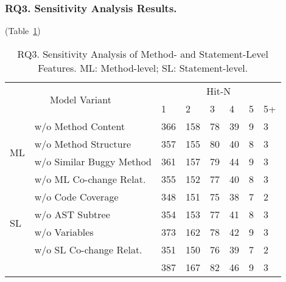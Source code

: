 \subsubsection{\bf RQ3. Sensitivity Analysis Results.} (Table~\ref{fig:rq3-1})~\label{sensi}

\begin{table}[t]
	\caption{RQ3. Sensitivity Analysis of Method- and Statement-Level Features. ML: Method-level; SL: Statement-level.}
        \vspace{-6pt}
	{\footnotesize
		\begin{center}
			\renewcommand{\arraystretch}{1}
			\begin{tabular}{p{0.3cm}<{\centering}|p{3cm}|p{0.3cm}<{\centering}|p{0.3cm}<{\centering}|p{0.2cm}<{\centering}|p{0.2cm}<{\centering}|p{0.15cm}<{\centering}|p{0.15cm}<{\centering}}
				\hline
				\multicolumn{2}{c|}{\multirow{2}{*}{Model Variant}}    & \multicolumn{6}{c}{Hit-N}\\
				\cline{3-8}
				                 \multicolumn{2}{c|}{}   &1&2&3&4&5&5+\\
				
				\hline 
				\multirow{4}{*}{ML}&w/o Method Content              & 366 & 158 & 78  & 39 & 9 & 3   \\\cline{2-8}
				&w/o	Method Structure	                        & 357 & 155 & 80  & 40 & 8 & 3   \\ \cline{2-8}
				&w/o Similar Buggy Method    	& 361 & 157 & 79  & 44 & 9 & 3   \\ \cline{2-8}
				&w/o ML Co-change Relat.         & 355 & 152 & 77  & 40 & 8 &  3   \\ \cline{2-8}
				\hline
				\multirow{4}{*}{SL}&w/o Code Coverage               & 348 & 151 & 75  & 38 & 7 & 2   \\\cline{2-8}
				&w/o	AST Subtree	        & 354 & 153 & 77  & 41 & 8 & 3   \\ \cline{2-8}
				&w/o Variables               	& 373 & 162 & 78  & 42 & 9 & 3   \\ \cline{2-8}
				&w/o SL Co-change Relat.        & 351 & 150 & 76 & 39 & 7 &  2   \\ \cline{2-8}
				\hline
			&	{\tool}                           & 387 & 167 & 82  & 46 & 9 & 3  \\ \cline{2-8}
				\hline
			\end{tabular}
			
			\label{fig:rq3-1}
		\end{center}
	}
\end{table}

